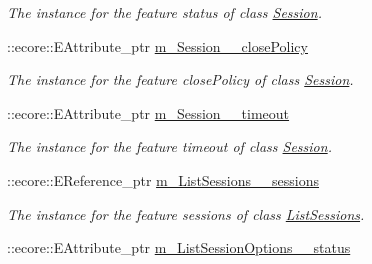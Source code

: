 \begin{DoxyCompactItemize}
\begin{DoxyCompactList}\small\item\em The instance for the feature status of class \hyperlink{classUMS__Data_1_1Session}{Session}. \item\end{DoxyCompactList}\item 
\hypertarget{classUMS__Data_1_1UMS__DataPackage_af9580c943512438f92d4e9b2ef67a4ca}{
::ecore::EAttribute\_\-ptr \hyperlink{classUMS__Data_1_1UMS__DataPackage_af9580c943512438f92d4e9b2ef67a4ca}{m\_\-Session\_\-\_\-closePolicy}}
\label{classUMS__Data_1_1UMS__DataPackage_af9580c943512438f92d4e9b2ef67a4ca}

\begin{DoxyCompactList}\small\item\em The instance for the feature closePolicy of class \hyperlink{classUMS__Data_1_1Session}{Session}. \item\end{DoxyCompactList}\item 
\hypertarget{classUMS__Data_1_1UMS__DataPackage_a39b002dd70edb36fdc923d03703c30e7}{
::ecore::EAttribute\_\-ptr \hyperlink{classUMS__Data_1_1UMS__DataPackage_a39b002dd70edb36fdc923d03703c30e7}{m\_\-Session\_\-\_\-timeout}}
\label{classUMS__Data_1_1UMS__DataPackage_a39b002dd70edb36fdc923d03703c30e7}

\begin{DoxyCompactList}\small\item\em The instance for the feature timeout of class \hyperlink{classUMS__Data_1_1Session}{Session}. \item\end{DoxyCompactList}\item 
\hypertarget{classUMS__Data_1_1UMS__DataPackage_ae5ad73e48556a3d62ec32ffeccdaf993}{
::ecore::EReference\_\-ptr \hyperlink{classUMS__Data_1_1UMS__DataPackage_ae5ad73e48556a3d62ec32ffeccdaf993}{m\_\-ListSessions\_\-\_\-sessions}}
\label{classUMS__Data_1_1UMS__DataPackage_ae5ad73e48556a3d62ec32ffeccdaf993}

\begin{DoxyCompactList}\small\item\em The instance for the feature sessions of class \hyperlink{classUMS__Data_1_1ListSessions}{ListSessions}. \item\end{DoxyCompactList}\item 
\hypertarget{classUMS__Data_1_1UMS__DataPackage_a94c95e418a1b6d0fa8e9f880d04dc2c5}{
::ecore::EAttribute\_\-ptr \hyperlink{classUMS__Data_1_1UMS__DataPackage_a94c95e418a1b6d0fa8e9f880d04dc2c5}{m\_\-ListSessionOptions\_\-\_\-status}}
\label{classUMS__Data_1_1UMS__DataPackage_a94c95e418a1b6d0fa8e9f880d04dc2c5}


\end{DoxyCompactItemize}
